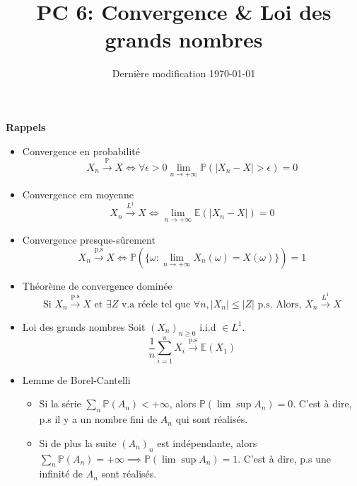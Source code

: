 \documentclass[french]{article}
\begin{document}
	
\title{PC 6: Convergence \& Loi des grands nombres}
\date{Dernière modification \today}

\maketitle

\begin{tcolorbox}[colback=red!5!white,colframe=red!75!black]
	\textbf{\large{Rappels}}
	\begin{itemize}
		\item Convergence en probabilité
		\[X_n \xrightarrow{\mathbb{P}} X \iff \forall \epsilon > 0 \lim_{n \to +\infty} \mathbb{P}(|X_n - X| > \epsilon) = 0\]
		\item Convergence em moyenne
		\[X_n \xrightarrow{L^1} X \iff  \lim_{n \to +\infty} \mathbb{E}(|X_n - X|) = 0\]
		\item Convergence presque-sûrement
		\[X_n \xrightarrow{\text{p.s}} X \iff  \mathbb{P}\left(\{\omega : \lim_{n \to +\infty} X_n(\omega) = X(\omega)\}\right) = 1\]
		\item Théorème de convergence dominée
		\[\text{Si } X_n \xrightarrow{\text{p.s}} X \text{ et } \exists Z \text{ v.a réele tel que } \forall n, |X_n| \leq |Z| \text{ p.s. Alors, } X_n \xrightarrow{L^1} X\]
		\item Loi des grands nombres
		Soit $(X_n)_{n \geq 0}$ i.i.d $\in L^1$.
		\[\frac{1}{n}\sum_{i=1}^{n} X_i \xrightarrow{\text{p.s}} \mathbb{E}(X_1)\]
		\item Lemme de Borel-Cantelli
		\begin{itemize}
			\item Si la série $\sum_n \mathbb{P}(A_n) < +\infty$, alors $\mathbb{P}(\lim \sup A_n) = 0$. C'est à dire, p.s il y a un nombre fini de $A_n$ qui sont réalisés.
			\item Si de plus la suite $(A_n)_n$ est indépendante, alors $\sum_{n} \mathbb{P}(A_n) = +\infty \implies \mathbb{P}(\lim \sup A_n) = 1$. C'est à dire, p.s une infinité de $A_n$ sont réalisés.
		\end{itemize}
	\end{itemize}
\end{tcolorbox}

\newpage
\end{document}
